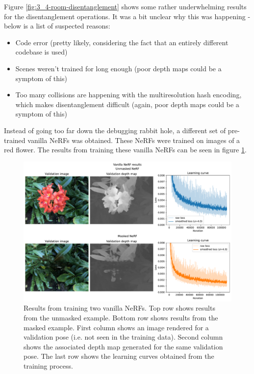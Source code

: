 Figure \ref{fig:3_4-room-disentanglement} shows some rather underwhelming results for the disentanglement operations. It was a bit unclear why this was happening - below is a list of suspected reasons:
\begin{itemize}[noitemsep]
    \item Code error (pretty likely, considering the fact that an entirely different codebase is used)
    \item Scenes weren't trained for long enough (poor depth maps could be a symptom of this)
    \item Too many collisions are happening with the multiresolution hash encoding, which makes disentanglement difficult (again, poor depth maps could be a symptom of this)
\end{itemize}

Instead of going too far down the debugging rabbit hole, a different set of pre-trained vanilla NeRFs was obtained. These NeRFs were trained on images of a red flower. The results from training these vanilla NeRFs can be seen in figure \ref{fig:3_4-flower-learning-curves}.

\begin{figure}[H]
    \centering
    \includegraphics[width=1.0\textwidth]{figures/3_4-flower-learning-curves.pdf}
    \caption{Results from training two vanilla NeRFs. Top row shows results from the unmasked example. Bottom row shows results from the masked example. First column shows an image rendered for a validation pose (i.e. not seen in the training data). Second column shows the associated depth map generated for the same validation pose. The last row shows the learning curves obtained from the training process.}
    \label{fig:3_4-flower-learning-curves}
\end{figure}


